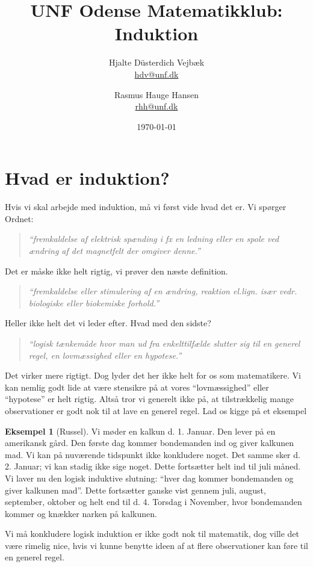 \documentclass[a4paper, 12pt]{article}
\numberwithin{equation}{section}
\theoremstyle{plain}
\theoremstyle{definition}
\newtheorem{eksempel}[saetning]{Eksempel}
\begin{document}
\title{UNF Odense Matematikklub: Induktion}
\author{Hjalte Düsterdich Vejbæk\\ \href{mailto:hdv@unf.dk}{hdv@unf.dk}\and Rasmus Hauge Hansen\\ \href{mailto:rhh@unf.dk}{rhh@unf.dk}}
\date{\today}
\maketitle{}
\thispagestyle{empty}

\newpage

\section{Hvad er induktion?}
Hvis vi skal arbejde med induktion, må vi først vide hvad det er. Vi spørger Ordnet:
    \begin{quote}
        \textit{``fremkaldelse af elektrisk spænding i fx en ledning eller en spole ved ændring af det magnetfelt der omgiver denne.''}
    \end{quote}
    Det er måske ikke helt rigtig, vi prøver den næste definition.
    \begin{quote}
        \textit{``fremkaldelse eller stimulering af en ændring, reaktion el.lign. især vedr. biologiske eller biokemiske forhold.''}
    \end{quote}
    Heller ikke helt det vi leder efter. Hvad med den sidste?
    \begin{quote}
        \textit{``logisk tænkemåde hvor man ud fra enkelttilfælde slutter sig til en generel regel, en lovmæssighed eller en hypotese.''}
    \end{quote}
    Det virker mere rigtigt. Dog lyder det her ikke helt for os som matematikere. Vi kan nemlig godt lide at være stensikre på at vores ``lovmæssighed'' eller ``hypotese'' er helt rigtig. Altså tror vi generelt ikke på, at tilstrækkelig mange observationer er godt nok til at lave en generel regel. Lad os kigge på et eksempel
    \begin{eksempel}[Russel]
        Vi møder en kalkun d. 1. Januar. Den lever på en amerikansk gård. Den første dag kommer bondemanden ind og giver kalkunen mad. Vi kan på nuværende tidspunkt ikke konkludere noget. Det samme sker d. 2. Januar; vi kan stadig ikke sige noget. Dette fortsætter helt ind til juli måned. Vi laver nu den logisk induktive slutning: ``hver dag kommer bondemanden og giver kalkunen mad''. Dette fortsætter ganske vist gennem juli, august, september, oktober og helt end til d. 4. Torsdag i November, hvor bondemanden kommer og knækker narken på kalkunen.
    \end{eksempel}
    Vi må konkludere logisk induktion er ikke godt nok til matematik, dog ville det være rimelig nice, hvis vi kunne benytte ideen af at flere observationer kan føre til en generel regel.
    
\end{document}
